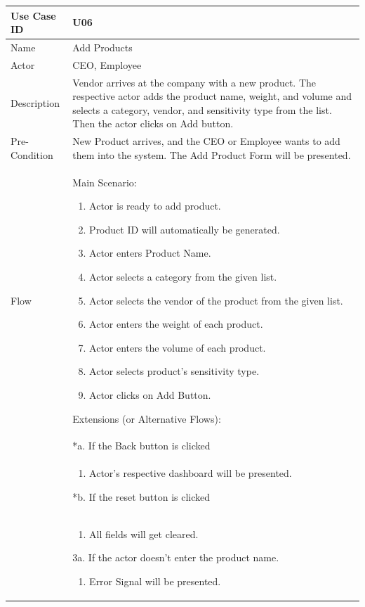 \documentclass[12pt,a4paper]{report}
\begin{document}
\begin{tabular}{ | m{3cm} | m{12cm}| } \hline

Use Case ID &  U06 \\\hline

Name  	    &  Add Products \\ \hline

Actor     	& CEO, Employee \\ \hline

Description &  Vendor arrives at the company with a new product. The respective actor adds the product name, weight, and volume and selects a category, vendor, and sensitivity type from the list. Then the actor clicks on Add button. \\ \hline



Pre-Condition &  New Product arrives, and the CEO or Employee wants to add them into the system. The Add Product Form will be presented. \\ \hline

Flow & Main Scenario:

\begin{enumerate}

\item Actor is ready to add product.
\item Product ID will automatically be generated.
\item Actor enters Product Name.
\item Actor selects a category from the given list.
\item Actor selects the vendor of the product from the given list.
\item Actor enters the weight of each product.
\item Actor enters the volume of each product.
\item Actor selects product's sensitivity type.
\item Actor clicks on Add Button.

\end{enumerate}

Extensions (or Alternative Flows):\\
& *a. If the Back button is clicked \\
& \begin{enumerate}
		\item Actor's respective dashboard will be presented.
	\end{enumerate}
*b. If the reset button is clicked \\
&	\begin{enumerate}
		\item All fields will get cleared.
	\end{enumerate}
3a. If the actor doesn't enter the product name.
 	\begin{enumerate}
		\item Error Signal will be presented.
	\end{enumerate}
\\ \hline
\end{tabular}
\end{document}
